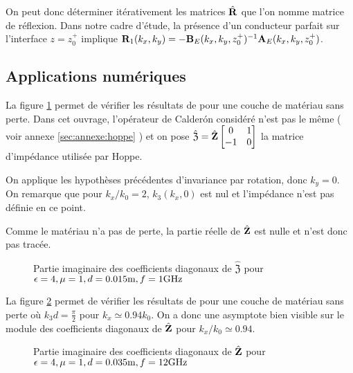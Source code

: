     On peut donc déterminer itérativement les matrices \(\hat{\mathbf{R}}\) que l'on nomme matrice de réflexion.
    Dans notre cadre d'étude, la présence d'un conducteur parfait sur l'interface \(z=z_0^+\) implique \(\mathbf{R}_{1}(k_x,k_y) = -\mathbf{B}_E(k_x,k_y,z_0^+)^{-1}\mathbf{A}_E(k_x,k_y,z_0^+)\).

\subsection{Applications numériques}

  La figure \ref{fig:imp_fourier:plan:hoppe} permet de vérifier les résultats de \cite[p.~33]{hoppe_impedance_1995} pour une couche de matériau sans perte.
  Dans cet ouvrage, l'opérateur de Calderón considéré n'est pas le même ( voir annexe \ref{sec:annexe:hoppe} ) et on pose \(\hat{\mathfrak{Z}} = \hat{\mathbf{Z}}\begin{bmatrix}0&1\\-1&0\end{bmatrix}\) la matrice d'impédance utilisée par Hoppe.

  On applique les hypothèses précédentes d'invariance par rotation, donc \(k_y=0\).
  On remarque que pour \(k_x\slash k_0=2\), \(k_3(k_x,0)\) est nul et l'impédance n'est pas définie en ce point. 

  Comme le matériau n'a pas de perte, la partie réelle de \(\hat{\mathfrak{\mathbf{Z}}}\) est nulle et n'est donc pas tracée.
  \begin{figure}[!hbt]
      \centering
      
      \caption[Reproduction résultat Hoppe & Rahmat-Samii p.~33]{Partie imaginaire des coefficients diagonaux de \(\hat{\mathfrak Z}\) pour \(\epsilon = 4, \mu = 1, d=0.015\text{m}, f=1\text{GHz}\)}
      \label{fig:imp_fourier:plan:hoppe}
  \end{figure}

  La figure \ref{fig:imp_fourier:plan:soudais} permet de vérifier les résultats de \cite{soudais_3d_2017} pour une couche de matériau sans perte où \(k_3d = \frac{\pi}{2}\) pour \(k_x \simeq 0.94 k_0\).
  On a donc une asymptote bien visible sur le module des coefficients diagonaux de \(\hat{\mathbf{Z}}\) pour \(k_x\slash k_0 \simeq 0.94\).
  \begin{figure}[!hbt]
      \centering
      
      \caption[Reproduction résultat P. Soudais p.~11]{Partie imaginaire des coefficients diagonaux de \(\hat{\mathbf{Z}}\) pour \(\epsilon = 4, \mu = 1, d=0.035\text{m}, f=12\text{GHz}\)}
      \label{fig:imp_fourier:plan:soudais}
  \end{figure}

